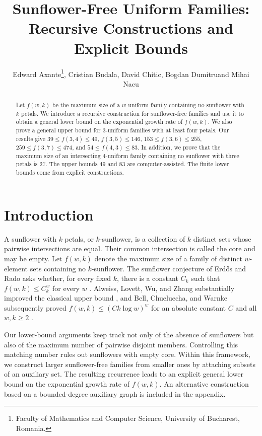 \documentclass[11pt]{article}
\title{Sunflower-Free Uniform Families: Recursive Constructions and Explicit Bounds}
\author{%
\small Edward Axante\thanks{Faculty of Mathematics and Computer Science,
 University of Bucharest, Romania.}, Cristian Budala\footnotemark[1],
 David Chitic\footnotemark[1], Bogdan Dumitru\footnotemark[1]\hspace{0.65em}and
 Mihai Nacu\footnotemark[1]%
}
\date{}
\numberwithin{equation}{section}
\theoremstyle{definition}
\theoremstyle{remark}
\begin{document}
\maketitle

\begin{abstract}
Let $f(w,k)$ be the maximum size of a $w$-uniform family containing no
sunflower with $k$ petals. We introduce a recursive construction for
sunflower-free families and use it to obtain a general lower bound on the
exponential growth rate of $f(w,k)$. We also prove a general upper bound for
$3$-uniform families with at least four petals. Our results give
$39\le f(3,4)\le49$, $f(3,5)\le146$,
$153\le f(3,6)\le255$, $259\le f(3,7)\le474$, and
$54\le f(4,3)\le83$. In addition, we prove that the maximum size of an
intersecting $4$-uniform family containing no sunflower with three petals is $27$.
The upper bounds $49$ and $83$ are computer-assisted. The finite lower
bounds come from explicit constructions.
\end{abstract}

\section{Introduction}
\label{sec:introduction}

A sunflower with $k$ petals, or $k$-sunflower, is a collection of $k$ distinct sets whose
pairwise intersections are equal. Their common intersection is called the
core and may be empty. Let $f(w,k)$ denote the maximum size of a family of
distinct $w$-element sets containing no $k$-sunflower. The
sunflower conjecture of Erd\H{o}s and Rado asks whether, for every fixed $k$,
there is a constant $C_k$ such that $f(w,k)\le C_k^w$ for every $w$
\cite{ErdosRado1960}. Alweiss, Lovett, Wu, and Zhang substantially improved
the classical upper bound \cite{AlweissLovettWuZhang2021}, and Bell,
Chueluecha, and Warnke subsequently proved
$f(w,k)\le (Ck\log w)^w$ for an absolute constant $C$ and all $w,k\ge2$
\cite{BellChueluechaWarnke2021}.

Our lower-bound arguments keep track not only of the absence of sunflowers but
also of the maximum number of pairwise disjoint members. Controlling this
matching number rules out sunflowers with empty core. Within this framework,
we construct larger sunflower-free families from smaller ones by attaching
subsets of an auxiliary set. The resulting recurrence leads to an explicit
general lower bound on the exponential growth rate of $f(w,k)$. An
alternative construction based on a bounded-degree auxiliary graph is
included in the appendix.
\end{document}
